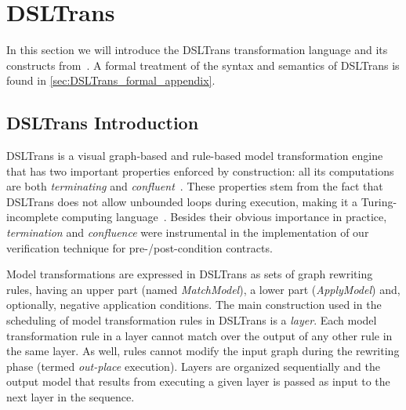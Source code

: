 \section{DSLTrans}
\label{sec:DSLTrans_formal}

In this section we will introduce the DSLTrans transformation language and its
constructs from~\cite{DBLP:conf/sle/BarrocaLAFS10}. A formal treatment of the syntax and semantics of DSLTrans is found in \cref{sec:DSLTrans_formal_appendix}.

\subsection{DSLTrans Introduction}

DSLTrans is a visual graph-based and rule-based model
transformation engine that has two important properties enforced by construction: all its computations
are both \emph{terminating} and \emph{confluent}~\cite{Barroca2011}.
These properties stem from the fact that DSLTrans does not allow
unbounded loops during execution, making it a Turing-incomplete
computing language~\cite{Barroca2011}. Besides their obvious importance in
practice, \emph{termination} and \emph{confluence} were instrumental in the
implementation of our verification technique for pre-/post-condition contracts.

Model transformations are expressed in DSLTrans as sets of graph rewriting
rules, having an upper part (named \emph{MatchModel}), a lower part (\emph{ApplyModel}) and,
optionally, negative application conditions. The main construction
used in the scheduling of model transformation rules in DSLTrans is a
\emph{layer}. Each model transformation rule in a layer cannot match over the output of any other rule in the same layer. As well, rules cannot modify the input graph during the rewriting phase (termed \emph{out-place} execution). Layers are organized sequentially and
the output model that results from executing a given layer is passed as input to
the next layer in the sequence.


